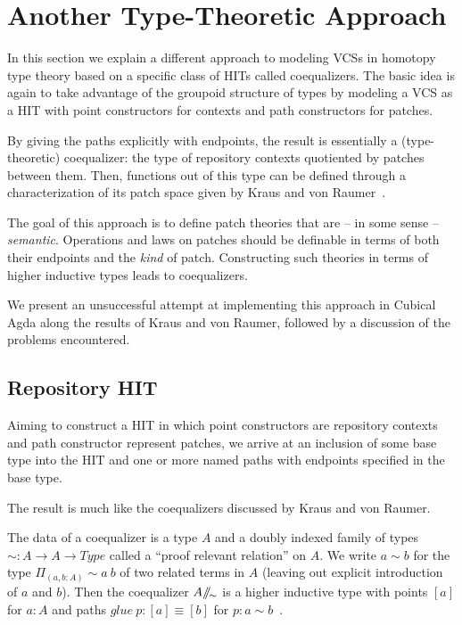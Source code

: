\section{Another Type-Theoretic Approach}\label{sec:attempt}

In this section we explain a different approach to modeling VCSs in homotopy
type theory based on a specific class of HITs called coequalizers. The basic
idea is again to take advantage of the groupoid structure of types by modeling a
VCS as a HIT with point constructors for contexts and path constructors for
patches.

By giving the paths explicitly with endpoints, the result is essentially a
(type-theoretic) coequalizer: the type of repository contexts quotiented by
patches between them. Then, functions out of this type can be defined through a
characterization of its patch space given by Kraus and von Raumer~\cite{kraus2019path}.

The goal of this approach is to define patch theories that are -- in some sense
-- \emph{semantic}. Operations and laws on patches should be definable in terms
of both their endpoints and the \emph{kind} of patch. Constructing such theories in
terms of higher inductive types leads to coequalizers.

We present an unsuccessful attempt at implementing this approach in Cubical Agda
along the results of Kraus and von Raumer, followed by a discussion of the
problems encountered.

\subsection{Repository HIT}

Aiming to construct a HIT in which point constructors are repository contexts and
path constructor represent patches, we arrive at an inclusion of some base type
into the HIT and one or more named paths with endpoints specified in the base type.

The result is much like the coequalizers discussed by Kraus and von Raumer.

The data of a coequalizer is a type $A$ and a doubly indexed family of types $\sim : A
\rightarrow A \rightarrow Type$ called a ``proof relevant relation'' on $A$. We
write $a \sim b$ for the type $\Pi_{(a,b : A)} \sim a~b$ of two related terms in
$A$ (leaving out explicit introduction of $a$ and $b$).
Then the coequalizer $A /\!\!/\!_{\sim}$ is a higher inductive type with points $[a]$ for
$a : A$ and paths $glue~p : [a] \equiv [b]$ for $p : a \sim b$~\cite{kraus2019path}.


